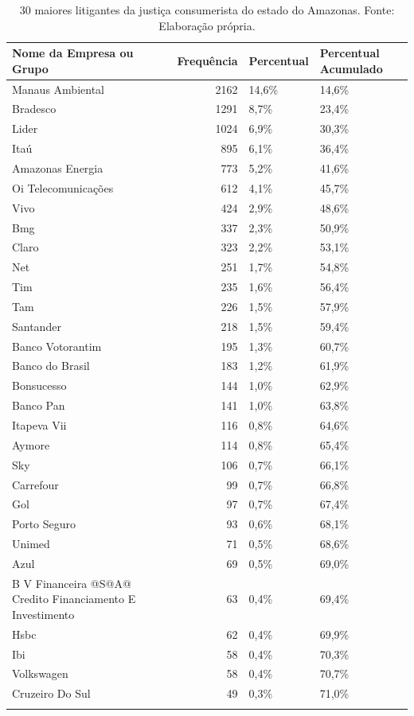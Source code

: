 \documentclass[]{report}
\begin{document}
\begin{longtable}{lrll}
\caption{30 maiores litigantes da justiça consumerista do estado do Amazonas. Fonte: Elaboração própria.} \\
  \hline
Nome da Empresa ou Grupo & Frequência & Percentual & Percentual Acumulado \\
  \hline
Manaus
Ambiental & 2162 & 14,6\% & 14,6\% \\
  Bradesco & 1291 & 8,7\% & 23,4\% \\
  Lider & 1024 & 6,9\% & 30,3\% \\
  Itaú & 895 & 6,1\% & 36,4\% \\
  Amazonas
Energia & 773 & 5,2\% & 41,6\% \\
  Oi
Telecomunicações & 612 & 4,1\% & 45,7\% \\
  Vivo & 424 & 2,9\% & 48,6\% \\
  Bmg & 337 & 2,3\% & 50,9\% \\
  Claro & 323 & 2,2\% & 53,1\% \\
  Net & 251 & 1,7\% & 54,8\% \\
  Tim & 235 & 1,6\% & 56,4\% \\
  Tam & 226 & 1,5\% & 57,9\% \\
  Santander & 218 & 1,5\% & 59,4\% \\
  Banco
Votorantim & 195 & 1,3\% & 60,7\% \\
  Banco do Brasil & 183 & 1,2\% & 61,9\% \\
  Bonsucesso & 144 & 1,0\% & 62,9\% \\
  Banco Pan & 141 & 1,0\% & 63,8\% \\
  Itapeva Vii & 116 & 0,8\% & 64,6\% \\
  Aymore & 114 & 0,8\% & 65,4\% \\
  Sky & 106 & 0,7\% & 66,1\% \\
  Carrefour &  99 & 0,7\% & 66,8\% \\
  Gol &  97 & 0,7\% & 67,4\% \\
  Porto Seguro &  93 & 0,6\% & 68,1\% \\
  Unimed &  71 & 0,5\% & 68,6\% \\
  Azul &  69 & 0,5\% & 69,0\% \\
  B V Financeira
@S@A@ Credito
Financiamento E
Investimento &  63 & 0,4\% & 69,4\% \\
  Hsbc &  62 & 0,4\% & 69,9\% \\
  Ibi &  58 & 0,4\% & 70,3\% \\
  Volkswagen &  58 & 0,4\% & 70,7\% \\
  Cruzeiro Do Sul &  49 & 0,3\% & 71,0\% \\
   \hline
\hline
\label{unnamed-chunk-77}
\end{longtable}
\end{document}
